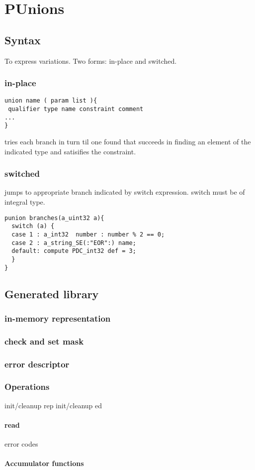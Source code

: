 \chapter{PUnions}
\label{chap:unions}
\section{Syntax}
To express variations.  Two forms: in-place and switched.
\subsection{in-place}
\begin{verbatim}
union name ( param list ){
 qualifier type name constraint comment
...
}
\end{verbatim}
tries each branch in turn til one found that succeeds in finding an
element of the indicated type and satisifies the constraint.

\subsection{switched}
jumps to appropriate branch indicated by switch expression.
switch must be of integral type. 
\begin{verbatim}
punion branches(a_uint32 a){
  switch (a) {
  case 1 : a_int32  number : number % 2 == 0;
  case 2 : a_string_SE(:"EOR":) name;
  default: compute PDC_int32 def = 3; 
  }
}
\end{verbatim}

\section{Generated library}
\subsection{in-memory representation}
\subsection{check and set mask}
\subsection{error descriptor}
\subsection{Operations}
init/cleanup rep
init/cleanup ed
\subsubsection{read}
  error codes
\subsubsection{Accumulator functions}

